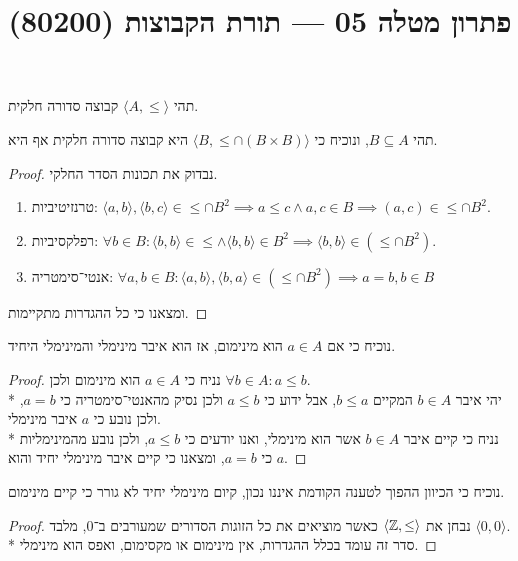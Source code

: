 
\title{פתרון מטלה 05 --- תורת הקבוצות (80200)}


\maketitle
\maketitleprint{}

\Question{}
תהי $\langle A, \le \rangle$ קבוצה סדורה חלקית.

\Subquestion{}
תהי $B \subseteq A$, ונוכיח כי $\langle B, \le \cap (B \times B) \rangle$ היא קבוצה סדורה חלקית אף היא.
\begin{proof}
	נבדוק את תכונות הסדר החלקי.
	\begin{enumerate}
		\item טרנזיטיביות: $\langle a, b \rangle, \langle b, c \rangle \in \le \cap B^2 \implies a \le c \land a, c \in B \implies (a, c) \in \le \cap B^2$.
		\item רפלקסיביות: $\forall b \in B : \langle b, b \rangle \in \le \land \langle b, b \rangle \in B^2 \implies \langle b, b \rangle \in (\le \cap B^2)$.
		\item אנטי־סימטריה: $\forall a, b \in B : \langle a, b \rangle, \langle b, a \rangle \in (\le \cap B^2) \implies a = b, b \in B$
	\end{enumerate}
	ומצאנו כי כל ההגדרות מתקיימות.
\end{proof}

\Subquestion{}
נוכיח כי אם $a \in A$ הוא מינימום, אז הוא איבר מינימלי והמינימלי היחיד.
\begin{proof}
	נניח כי $a \in A$ הוא מינימום ולכן $\forall b \in A : a \le b$. \\*
	יהי איבר $b \in A$ המקיים $b \le a$, אבל ידוע כי $a \le b$ ולכן נסיק מהאנטי־סימטריה כי $a = b$, ולכן נובע כי $a$ איבר מינימלי. \\*
	נניח כי קיים איבר $b \in A$ אשר הוא מינימלי, ואנו יודעים כי $a \le b$, ולכן נובע מהמינימליות כי $a = b$, ומצאנו כי קיים איבר מינימלי יחיד והוא $a$.
\end{proof}

\Subquestion{}
נוכיח כי הכיוון ההפוך לטענה הקודמת איננו נכון, קיום מינימלי יחיד לא גורר כי קיים מינימום.
\begin{proof}
	נבחן את $\langle \mathbb{Z}, \le \rangle$ כאשר מוציאים את כל הזוגות הסדורים שמעורבים ב־$0$, מלבד $\langle 0, 0 \rangle$. \\*
	סדר זה עומד בכלל ההגדרות, אין מינימום או מקסימום, ואפס הוא מינימלי.
\end{proof}

